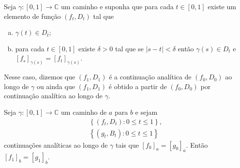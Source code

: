 \begin{definicao}
\label{def-continuacao-analitica}
Seja $\gamma: [0,1] \to \mathbb{C}$ um caminho e suponha que para cada
$t\in[0,1]$ existe um elemento de função $(f_t, D_t)$ tal que
\begin{enumerate}[(a)]
    \item $\gamma(t) \in D_t$;
    \item para cada $t\in[0,1]$ existe $\delta > 0$ tal que se $|s-t| < \delta$
    então $\gamma(s) \in D_t$ e $[f_s]_{\gamma(s)} = [f_t]_{\gamma(s)}$.
\end{enumerate}
Nesse caso, dizemos que $(f_1, D_1)$ é a continuação analítica de $(f_0,D_0)$ ao 
longo de $\gamma$ ou ainda que $(f_1, D_1)$ é obtido a partir de $(f_0,D_0)$ por
continuação analítica ao longo de $\gamma$.
\end{definicao}


\begin{proposicao}
\label{prop-unicidade-continuacao-analitica-caminho}
Seja $\gamma: [0,1]\to\mathbb{C}$ um caminho de $a$ para $b$ e sejam
\begin{align*}
    \left\{ (f_t, D_t): 0\leq t\leq 1 \right\}, \\
    \left\{ (g_t, B_t): 0\leq t\leq 1 \right\}
\end{align*}
continuações analíticas ao longo de $\gamma$ tais que $[f_0]_a = [g_0]_a$.
Então $[f_1]_b = [g_1]_b$.
\end{proposicao}

